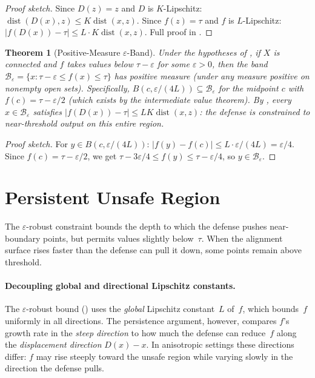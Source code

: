 \documentclass{article}
\newtheorem{theorem}{Theorem}[section]
\newcommand{\dist}{\operatorname{dist}}
\begin{document}
\begin{proof}[Proof sketch]
Since $D(z)=z$ and $D$ is $K$-Lipschitz:
$\dist(D(x),z) \leq K\dist(x,z)$. Since $f(z)=\tau$ and $f$ is
$L$-Lipschitz:
$|f(D(x)) - \tau| \leq L \cdot K\dist(x,z)$.
Full proof in .
\end{proof}

\begin{theorem}[Positive-Measure $\varepsilon$-Band]
\label{thm:band-measure}
Under the hypotheses of , if $X$ is connected
and $f$ takes values below $\tau - \varepsilon$ for some
$\varepsilon > 0$, then the band
$\mathcal{B}_\varepsilon = \{x : \tau - \varepsilon \leq f(x)
\leq \tau\}$ has positive measure (under any measure positive on
nonempty open sets).
Specifically, $B(c, \varepsilon/(4L)) \subseteq
\mathcal{B}_\varepsilon$ for the midpoint $c$ with
$f(c) = \tau - \varepsilon/2$ (which exists by the intermediate
value theorem).
By , every $x \in \mathcal{B}_\varepsilon$
satisfies $|f(D(x)) - \tau| \leq LK\dist(x, z)$: the defense is
constrained to near-threshold output on this entire region.
\end{theorem}

\begin{proof}[Proof sketch]
For $y \in B(c, \varepsilon/(4L))$: $|f(y) - f(c)| \leq L \cdot \varepsilon/(4L) = \varepsilon/4$. Since $f(c) = \tau - \varepsilon/2$, we get $\tau - 3\varepsilon/4 \leq f(y) \leq \tau - \varepsilon/4$, so $y \in \mathcal{B}_\varepsilon$.
\end{proof}

\section{Persistent Unsafe Region}
\label{sec:persistent}

The $\varepsilon$-robust constraint bounds the depth to which the
defense pushes near-boundary points, but permits values slightly
below~$\tau$. When the alignment surface rises faster than the
defense can pull it down, some points remain above threshold.

\paragraph{Decoupling global and directional Lipschitz constants.}
The $\varepsilon$-robust bound () uses the
\emph{global} Lipschitz constant~$L$ of~$f$, which bounds~$f$
uniformly in all directions. The persistence argument, however,
compares $f$'s growth rate in the \emph{steep direction} to how much
the defense can reduce~$f$ along the \emph{displacement direction}
$D(x) - x$. In anisotropic settings these directions differ: $f$ may
rise steeply toward the unsafe region while varying slowly in the
direction the defense pulls.
\end{document}
